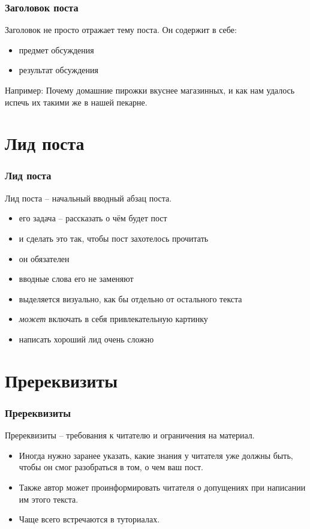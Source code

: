\documentclass[12pt]{beamer}
\begin{document}
\begin{frame}
  \frametitle{Заголовок поста}
  Заголовок не просто отражает тему поста. Он содержит в себе:
  \begin{itemize}
  \item предмет обсуждения
  \item результат обсуждения
  \end{itemize}
  Например: Почему домашние пирожки вкуснее магазинных, и как нам удалось испечь
  их такими же в нашей пекарне.
\end{frame}

\section{Лид поста}

\begin{frame}
  \frametitle{Лид поста}
  Лид поста -- начальный вводный абзац поста.
  \begin{itemize}
  \item его задача -- рассказать о чём будет пост
  \item и сделать это так, чтобы пост захотелось прочитать
  \item он обязателен
  \item вводные слова его не заменяют
  \item выделяется визуально, как бы отдельно от остального текста
  \item \emph{может} включать в себя привлекательную картинку
  \item написать хороший лид очень сложно
  \end{itemize}
\end{frame}

\section{Пререквизиты}

\begin{frame}
  \frametitle{Пререквизиты}
  Пререквизиты -- требования к читателю и ограничения на материал.
  \begin{itemize}
  \item Иногда нужно заранее указать, какие знания у читателя уже должны быть,
    чтобы он смог разобраться в том, о чем ваш пост.
  \item Также автор может проинформировать читателя о допущениях при написании
    им этого текста.
  \item Чаще всего встречаются в туториалах.
  \end{itemize}
\end{frame}
\end{document}
